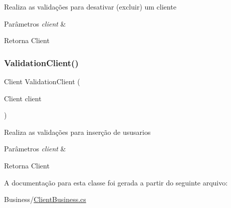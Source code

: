 Realiza as validações para desativar (excluir) um cliente 


\begin{DoxyParams}{Parâmetros}
{\em client} & \\
\hline
\end{DoxyParams}
\begin{DoxyReturn}{Retorna}
Client
\end{DoxyReturn}
\mbox{\label{classBusiness_1_1ClientBusiness_a8342831feddce88564ead2ac46ea1550}} 
\subsubsection{\texorpdfstring{Validation\+Client()}{ValidationClient()}}
{\footnotesize\ttfamily Client Validation\+Client (\begin{DoxyParamCaption}\item[{Client}]{client }\end{DoxyParamCaption})}



Realiza as validações para inserção de ususarios 


\begin{DoxyParams}{Parâmetros}
{\em client} & \\
\hline
\end{DoxyParams}
\begin{DoxyReturn}{Retorna}
Client
\end{DoxyReturn}


A documentação para esta classe foi gerada a partir do seguinte arquivo\+:\begin{DoxyCompactItemize}
\item 
Business/\hyperlink{ClientBusiness_8cs}{Client\+Business.\+cs}\end{DoxyCompactItemize}
